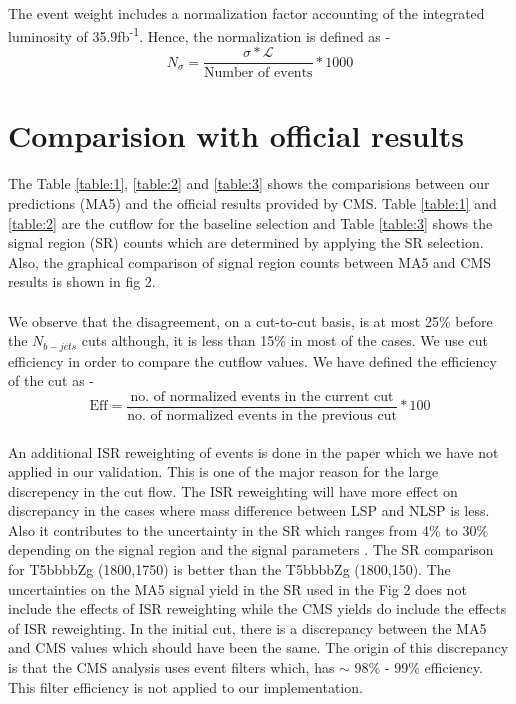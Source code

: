 \documentclass[a4paper, 10pt]{article}
\begin{document}
\paragraph{}
The event weight includes a normalization factor accounting of the integrated luminosity of 35.9fb\textsuperscript{-1}.
Hence, the normalization is defined as - 
$$ N_\sigma = \frac{\sigma * \mathcal{L}}{\text{Number of events}} * 1000    $$

\section{Comparision with official results}
\paragraph{}
The Table \ref{table:1}, \ref{table:2} and \ref{table:3} shows the comparisions between our predictions (MA5) and the official results provided by CMS. Table \ref{table:1} and \ref{table:2} are the cutflow for the baseline selection and Table \ref{table:3} shows the signal region (SR) counts which are determined by applying the SR selection. Also, the graphical comparison of signal region counts between MA5 and CMS results is shown in fig 2.
\\ 

\paragraph{}
We observe that the disagreement, on a cut-to-cut basis, is at most 25\% before the $N_{b-jets}$ cuts although, it is less than 15\% in most of the cases. We use cut efficiency in order to compare the cutflow values.  We have defined the efficiency of the cut as - $$ \text{Eff} = \frac{\text{no. of normalized events in the current cut}}{\text{no. of normalized events in the previous cut}} * 100 $$
\paragraph{}
 An additional ISR reweighting of events is done in the paper which we have not applied in our validation. This is one of the major reason for the large discrepency in the cut flow. The ISR reweighting will have more effect on discrepancy in the cases where mass difference between LSP and NLSP is less. Also it contributes to the uncertainty in the SR which ranges from 4\% to 30\% depending on the signal region and the signal parameters \cite{paper}. The SR comparison for T5bbbbZg (1800,1750) is better than the T5bbbbZg (1800,150). The uncertainties on the MA5 signal yield in the SR used in the Fig 2 does not include the effects of ISR reweighting while the CMS yields do include the effects of ISR reweighting. In the initial cut, there is a discrepancy between the MA5 and CMS values which should have been the same. The origin of this discrepancy is that the CMS analysis uses event filters which, has $\sim$ 98\% - 99\% efficiency. This filter efficiency is not applied to our implementation. 
 
\end{document}
